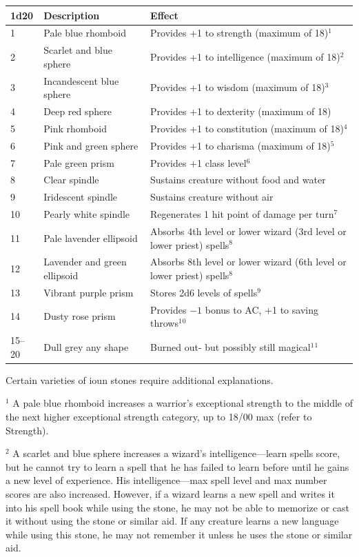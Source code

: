 \begin{multicols}{2}
\noindent \begin{tabular}{|p{}|p{}|p{}|}
\hline
1d20	& Description	& Effect \\
\hline\hline
\rowcolor[gray]{.9}1	& Pale blue rhomboid	& Provides +1 to strength (maximum of 18)$^1$ \\
2	& Scarlet and blue sphere	& Provides +1 to intelligence (maximum of 18)$^2$ \\
\rowcolor[gray]{.9}3	& Incandescent blue sphere	& Provides +1 to wisdom (maximum of 18)$^3$ \\
4	& Deep red sphere	& Provides +1 to dexterity (maximum of 18)  \\
\rowcolor[gray]{.9}5	& Pink rhomboid	& Provides +1 to constitution (maximum of 18)$^4$ \\
6	& Pink and green sphere	& Provides +1 to charisma (maximum of 18)$^5$ \\
\rowcolor[gray]{.9}7	& Pale green prism	& Provides +1 class level$^6$ \\
8	& Clear spindle	& Sustains creature without food and water \\
\rowcolor[gray]{.9}9	& Iridescent spindle	& Sustains creature without air \\
10	& Pearly white spindle	& Regenerates 1 hit point of damage per turn$^7$ \\
\rowcolor[gray]{.9}11	& Pale lavender ellipsoid	& Absorbs 4th level or lower wizard (3rd level or lower priest) spells$^8$ \\
12	& Lavender and green ellipsoid	& Absorbs 8th level or lower wizard (6th level or lower priest) spells$^8$ \\
\rowcolor[gray]{.9}13	& Vibrant purple prism	& Stores 2d6 levels of spells$^9$ \\
14	& Dusty rose prism	& Provides $-1$ bonus to AC, +1 to saving throws$^1$$^0$ \\
\rowcolor[gray]{.9}15--20	& Dull grey any shape	& Burned out- but possibly still magical$^1$$^1$ \\
\hline
\end{tabular}

Certain varieties of ioun stones require additional explanations.  

$^1$ A pale blue rhomboid increases a warrior's exceptional strength to the middle of the next higher exceptional strength category, up to 18/00 max (refer to Strength). 

$^2$ A scarlet and blue sphere increases a wizard's intelligence---learn spells score, but he cannot try to learn a spell that he has failed to learn before until he gains a new level of experience.  His intelligence---max spell level and max number scores are also increased.  However, if a wizard learns a new spell and writes it into his spell book while using the stone, he may not be able to memorize or cast it without using the stone or similar aid.  If any creature learns a new language while using this stone, he may not remember it unless he uses the stone or similar aid.  


\end{multicols}
